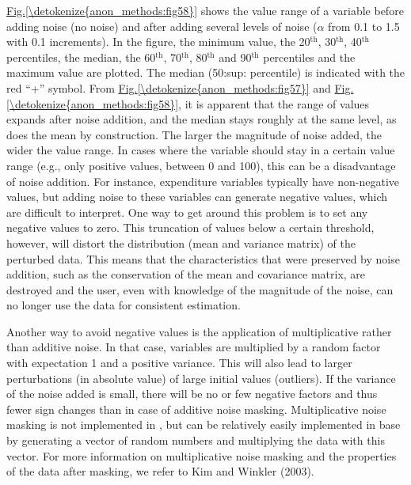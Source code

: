 \documentclass[letterpaper,10pt,english]{sphinxmanual}
\begin{document}
\hyperref[\detokenize{anon_methods:fig58}]{Fig.\@ \ref{\detokenize{anon_methods:fig58}}} shows the value range of a variable before adding noise (no
noise) and after adding several levels of noise (\(\alpha\) from 0.1
to 1.5 with 0.1 increments). In the figure, the minimum value, the
20$^{\text{th}}$, 30$^{\text{th}}$, 40$^{\text{th}}$ percentiles, the median, the
60$^{\text{th}}$, 70$^{\text{th}}$, 80$^{\text{th}}$ and 90$^{\text{th}}$
percentiles and the maximum value are plotted. The median (50:sup:
percentile) is indicated with the red “+” symbol. From \hyperref[\detokenize{anon_methods:fig57}]{Fig.\@ \ref{\detokenize{anon_methods:fig57}}} and
\hyperref[\detokenize{anon_methods:fig58}]{Fig.\@ \ref{\detokenize{anon_methods:fig58}}}, it is apparent that the range of values expands after noise
addition, and the median stays roughly at the same level, as does the
mean by construction. The larger the magnitude of noise added, the wider
the value range. In cases where the variable should stay in a certain
value range (e.g., only positive values, between 0 and 100), this can be
a disadvantage of noise addition. For instance, expenditure variables
typically have non-negative values, but adding noise to these variables
can generate negative values, which are difficult to interpret. One way
to get around this problem is to set any negative values to zero. This
truncation of values below a certain threshold, however, will distort
the distribution (mean and variance matrix) of the perturbed data. This
means that the characteristics that were preserved by noise addition,
such as the conservation of the mean and covariance matrix, are
destroyed and the user, even with knowledge of the magnitude of the
noise, can no longer use the data for consistent estimation.

Another way to avoid negative values is the application of
multiplicative rather than additive noise. In that case, variables are
multiplied by a random factor with expectation 1 and a positive
variance. This will also lead to larger perturbations (in absolute
value) of large initial values (outliers). If the variance of the noise
added is small, there will be no or few negative factors and thus fewer
sign changes than in case of additive noise masking. Multiplicative
noise masking is not implemented in , but can be relatively
easily implemented in base  by generating a vector of random numbers
and multiplying the data with this vector. For more information on
multiplicative noise masking and the properties of the data after
masking, we refer to Kim and Winkler (2003).
\end{document}
